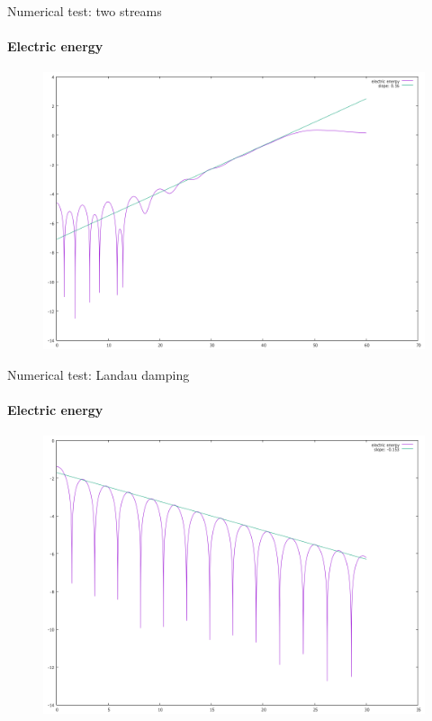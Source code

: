 \documentclass{beamer}
\begin{document}
  \begin{frame}{Numerical test: two streams}
  	\framesubtitle{Electric energy}
  	\begin{figure}
        \centering
        \includegraphics[height=0.55\textheight]{img/Enrj_2beams.png}
      \end{figure}
  \end{frame}


  \begin{frame}{Numerical test: Landau damping}
  	\framesubtitle{Electric energy}
  	\begin{figure}
        \centering
        \includegraphics[height=0.55\textheight]{img/Enrj_landau.png}
      \end{figure}
  \end{frame}
\end{document}

